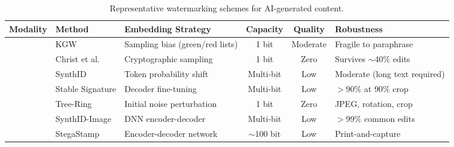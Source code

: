 
\begin{table}[htbp]
\centering
\caption{Representative watermarking schemes for AI-generated content.}
\label{tab:watermark}

\fontsize{7}{7}\selectfont
\setlength{\tabcolsep}{5pt}
\renewcommand{\arraystretch}{1.3}

\begin{tabularx}{\textwidth}{
  >{\centering\arraybackslash}p{1.2cm}
  >{\raggedright\arraybackslash}p{2.4cm}
  >{\raggedright\arraybackslash}p{4.2cm}
  c
  c
  >{\raggedright\arraybackslash}X
}
\toprule
\textbf{Modality} & \textbf{Method} & \textbf{Embedding Strategy} & \textbf{Capacity} & \textbf{Quality} & \textbf{Robustness} \\
\midrule

\rowcolor{rowgray}
\multirow{3}{*}{Text}
  & KGW
  & Sampling bias (green/red lists)
  & 1 bit & Moderate
  & Fragile to paraphrase \\[6pt]

\rowcolor{rowgray}
  & Christ et al.
  & Cryptographic sampling
  & 1 bit & Zero
  & Survives $\sim$40\% edits \\[6pt]

\rowcolor{rowgray}
  & SynthID
  & Token probability shift
  & Multi-bit & Low
  & Moderate (long text required) \\

\addlinespace[2pt]
\cmidrule(lr){1-6}
\addlinespace[2pt]

\multirow{4}{*}{Image}
  & Stable Signature
  & Decoder fine-tuning
  & Multi-bit & Low
  & $>$90\% at 90\% crop \\[6pt]

  & Tree-Ring
  & Initial noise perturbation
  & 1 bit & Zero
  & JPEG, rotation, crop \\[6pt]

  & SynthID-Image
  & DNN encoder-decoder
  & Multi-bit & Low
  & $>$99\% common edits \\[6pt]

  & StegaStamp
  & Encoder-decoder network
  & $\sim$100 bit & Low
  & Print-and-capture \\

\bottomrule
\end{tabularx}
\end{table}
